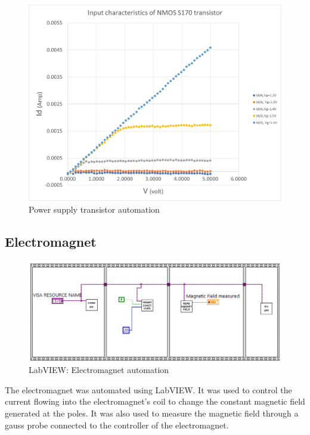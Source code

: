 \documentclass[12pt,a4paper,bold]{thesis}
\theoremstyle{thm}
\theoremstyle{definition}
\begin{document}
\begin{figure}[H]
	\centering
   \includegraphics[scale=0.56]{Images/48.png} 
   \caption{Power supply transistor automation}
\end{figure}
\subsection{Electromagnet}
\begin{figure}[H]
	\centering
   \includegraphics[scale=0.56]{Images/49.png} 
   \caption{LabVIEW: Electromagnet automation}
\end{figure}
The electromagnet was automated using LabVIEW. It was used to control the current flowing into the electromagnet's coil to change the constant magnetic field generated at the poles. It was also used to measure the magnetic field through a gauss probe connected to the controller of the electromagnet.
\end{document}
